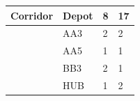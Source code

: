 \begin{tabular}{llll}
\toprule
Corridor & Depot & 8 & 17 \\
\midrule
 & AA3 & 2 & 2 \\
 & AA5 & 1 & 1 \\
 & BB3 & 2 & 1 \\
 & HUB & 1 & 2 \\
\bottomrule
\end{tabular}
